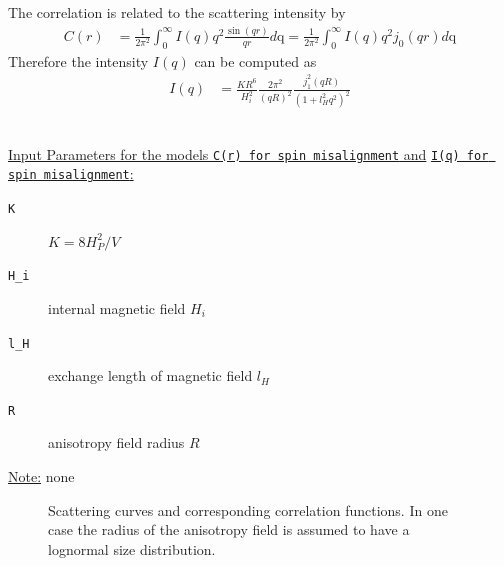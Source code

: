 The correlation is related to the scattering intensity by
\begin{align}
C(r) &= \frac{1}{2\pi^2} \int_0^\infty I(q) q^2
\frac{\sin(qr)}{qr}d\text{q}
 = \frac{1}{2\pi^2} \int_0^\infty I(q) q^2 j_0(qr) d\text{q}
\end{align}
Therefore the intensity $I(q)$ can be
computed as
\begin{align}
I(q) & = \frac{K R^6}{H_i^2}
\frac{2\pi^2}{\left(qR\right)^2}\frac{j_1^2(qR)}{\left(1+l_H^2q^2\right)^2}
\end{align}

\vspace{5mm}

\hspace{1pt}\\
\underline{Input Parameters for the models \texttt{C(r) for spin
misalignment} and} \newline \underline{\texttt{I(q) for spin misalignment}:}\\
\begin{description}
\item[\texttt{K}] $K=8H^2_P/V$
\item[\texttt{H\_i}] internal magnetic field $H_i$
\item[\texttt{l\_H}] exchange length of magnetic field $l_H$
\item[\texttt{R}] anisotropy field radius $R$
\end{description}

\noindent\underline{Note:}
none


\begin{figure}[htb]
\begin{center}
\hfill {}
\end{center}
\caption{Scattering curves and corresponding correlation functions.
In one case the radius of the anisotropy field is assumed to have a
lognormal size distribution.} \label{fig:MagSpinMisAlignment}
\end{figure}


